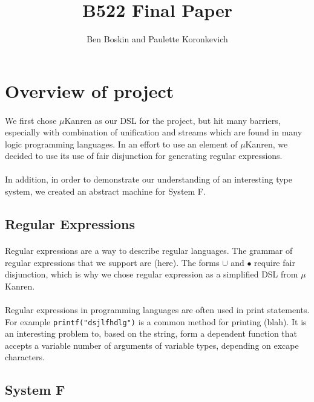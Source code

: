 \documentclass[12pt]{article}
\begin{document}
\title{B522 Final Paper}
\author{Ben Boskin and Paulette Koronkevich}
\maketitle


\section{Overview of project}
\paragraph{} We first chose $\mu$Kanren as our DSL for the project, but hit many barriers, especially with combination of unification and streams which are found in many logic programming languages. In an effort to use an element of $\mu$Kanren, we decided to use its use of fair disjunction for generating regular expressions.
\paragraph{} In addition, in order to demonstrate our understanding of an interesting type system, we created an abstract machine for System F.

\subsection{Regular Expressions}
\paragraph{} Regular expressions are a way to describe regular languages. The grammar of regular expressions that we support are (here). The forms $\cup$ and $\bullet$ require fair disjunction, which is why we chose regular expression as a simplified DSL from $\mu$Kanren.
\paragraph{} Regular expressions in programming languages are often used in print statements. For example \texttt{printf("dsjlfhdlg")} is a common method for printing (blah). It is an interesting problem to, based on the string, form a dependent function that accepts a variable number of arguments of variable types, depending on excape characters. 

\subsection{System F}
\end{document}
